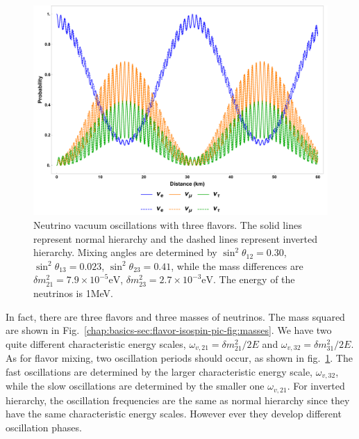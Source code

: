 \begin{figure}
    \centering
    \includegraphics[width=\textwidth]{chapters/assets/basics/vacuum-oscillations-3-flavor.pdf}
    \caption{Neutrino vacuum oscillations with three flavors. The solid lines represent normal hierarchy and the dashed lines represent inverted hierarchy. Mixing angles are determined by $\sin^2\theta_{12}=0.30$, $\sin^2\theta_{13}=0.023$, $\sin^2\theta_{23}=0.41$, while the mass differences are $\delta m_{21}^2 = 7.9\times 10^{-5}\mathrm{eV}$, $\delta m^2_{23}=2.7\times 10^{-3}\mathrm{eV}$. The energy of the neutrinos is 1MeV.}
    \label{chap:basics-section:neutrinos-fig:vacuum-3-flavor-osc}
\end{figure}





In fact, there are three flavors and three masses of neutrinos. The mass squared are shown in Fig.~\ref{chap:basics-sec:flavor-isospin-pic-fig:masses}. We have two quite different characteristic energy scales, $\omega_{v,21}=\delta m_{21}^2/2E$ and $\omega_{v,32}=\delta m_{31}^2/2E$. As for flavor mixing, two oscillation periods should occur, as shown in fig.~\ref{chap:basics-section:neutrinos-fig:vacuum-3-flavor-osc}. The fast oscillations are determined by the larger characteristic energy scale, $\omega_{v,32}$, while the slow oscillations are determined by the smaller one $\omega_{v,21}$. For inverted hierarchy, the oscillation frequencies are the same as normal hierarchy since they have the same characteristic energy scales. However ever they develop different oscillation phases.



